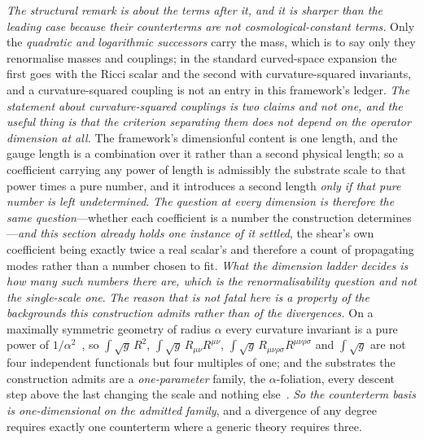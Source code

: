 \documentclass[11pt,a4paper]{article}
\theoremstyle{plain}
\theoremstyle{definition}
\theoremstyle{remark}
\begin{document}
\emph{The structural remark is about the terms after it, and it is sharper than the leading case
because their counterterms are not cosmological-constant terms.} Only the \emph{quadratic and
logarithmic successors} carry the mass, which is to say only they renormalise masses and couplings; in
the standard curved-space expansion the first goes with the Ricci scalar and the second with
curvature-squared invariants, and a curvature-squared coupling is not an entry in this framework's
ledger.  \emph{The statement about curvature-squared couplings is two claims and not one, and the useful thing is that the
criterion separating them does not depend on the operator dimension at all.} The framework's dimensionful
content is one length, and the gauge length is a combination over it rather than a second physical
length; so a coefficient carrying any power of length is admissibly the substrate scale to that power
times a pure number, and it introduces a second length \emph{only if that pure number is left
undetermined}. \emph{The question at every dimension is therefore the same question}---whether each
coefficient is a number the construction determines---\emph{and this section already holds one instance
of it settled}, the shear's own coefficient being exactly twice a real scalar's and therefore a count of
propagating modes rather than a number chosen to fit. \emph{What the dimension ladder decides is how many
such numbers there are, which is the renormalisability question and not the single-scale
one}. \emph{The reason that is not fatal here is a property of the backgrounds this construction
admits rather than of the divergences.} On a maximally symmetric geometry of radius $\alpha$ every
curvature invariant is a pure power of $1/\alpha^{2}$~\cite{JanzenGeometricCore}, so
$\int\!\sqrt{g}\,R^{2}$, $\int\!\sqrt{g}\,R_{\mu\nu}R^{\mu\nu}$,
$\int\!\sqrt{g}\,R_{\mu\nu\rho\sigma}R^{\mu\nu\rho\sigma}$ and $\int\!\sqrt{g}$ are not four
independent functionals but four multiples of one; and the substrates the construction admits are a
\emph{one-parameter} family, the $\alpha$-foliation, every descent step above the last changing the
scale and nothing else~\cite{JanzenGeometricCore, JanzenAlgebroid}. \emph{So the counterterm basis is
one-dimensional on the admitted family}, and a divergence of any degree requires
exactly one counterterm where a generic theory requires three.
\end{document}
